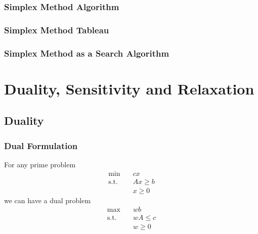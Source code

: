 			\subsection{Simplex Method Algorithm}

			\subsection{Simplex Method Tableau}

			\subsection{Simplex Method as a Search Algorithm}

	\chapter{Duality, Sensitivity and Relaxation}
		\section{Duality}
			\subsection{Dual Formulation}
				For any prime problem
				\begin{align}
					\text{min} \quad & cx \\
					\text{s.t.} \quad & Ax\ge b \\
								& x\ge 0 
				\end{align}
				we can have a dual problem
				\begin{align}
					\text{max} \quad & wb  \\
					\text{s.t.} \quad & wA\le c\\
								& w \ge 0
				\end{align}

